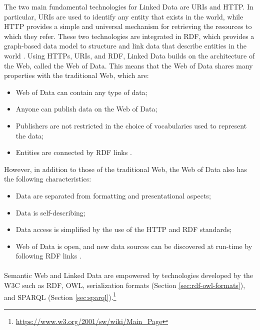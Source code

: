 The two main fundamental technologies for Linked Data are \acp{URI} and \ac{HTTP}. In particular, \acp{URI} are used to identify any entity that exists in the world, while \ac{HTTP} provides a simple and universal mechanism for retrieving the resources to which they refer. These two technologies are integrated in \ac{RDF}, which provides a graph-based data model to structure and link data that describe entities in the world \cite{bizer2011linked}. Using \acp{HTTP}, \acp{URI}, and \ac{RDF}, Linked Data builds on the architecture of the Web, called the Web of Data. This means that the Web of Data shares many properties with the traditional Web, which are:

\begin{itemize}
    \item Web of Data can contain any type of data;
    \item Anyone can publish data on the Web of Data;
    \item Publishers are not restricted in the choice of vocabularies used to represent the data;
    \item Entities are connected by \ac{RDF} links \cite{bizer2011linked}.
\end{itemize}

However, in addition to those of the traditional Web, the Web of Data also has the following characteristics:

\begin{itemize}
    \item Data are separated from formatting and presentational aspects;
    \item Data is self-describing;
    \item Data access is simplified by the use of the \ac{HTTP} and \ac{RDF} standards;
    \item Web of Data is open, and new data sources can be discovered at run-time by following \ac{RDF} links \cite{bizer2011linked}.
\end{itemize}

\paragraph*{}
Semantic Web and Linked Data are empowered by technologies developed by the \acl{W3C} such as \acs{RDF}, \acs{OWL}, serialization formats (Section \ref{sec:rdf-owl-formats}), and \acs{SPARQL} (Section \ref{sec:sparql}).\footnote{\url{https://www.w3.org/2001/sw/wiki/Main_Page}}